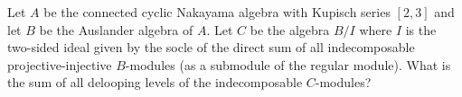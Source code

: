 Let $A$ be the connected cyclic Nakayama algebra with Kupisch series $[2,3]$ and let $B$ be the Auslander algebra of $A$. Let $C$ be the algebra $B/I$ where $I$ is the two-sided ideal given by the socle of the direct sum of all indecomposable projective-injective $B$-modules (as a submodule of the regular module). What is the sum of all delooping levels of the indecomposable $C$-modules?

